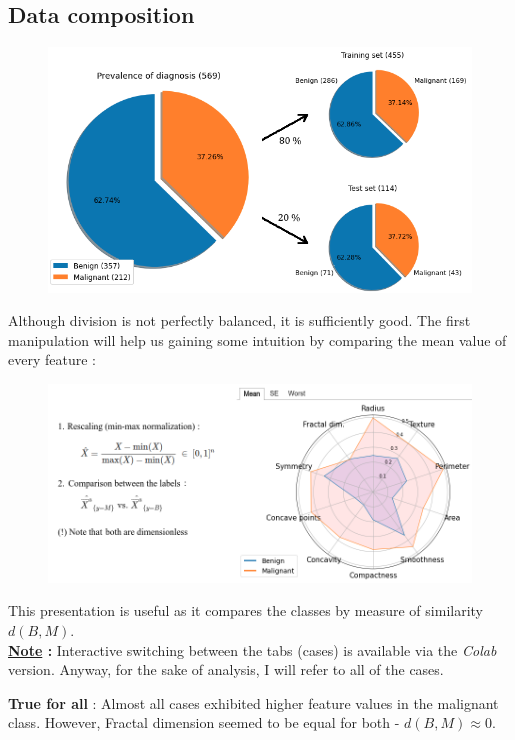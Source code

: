 \documentclass[12pt]{article}
\numberwithin{equation}{section}
\begin{document}
\begin{flushleft}
\subsection{Data composition}
\begin{figure}[H]
\centering
\includegraphics[width=0.82\linewidth, center]{train_split.png}
\end{figure}
Although division is not perfectly balanced, it is sufficiently good. The first manipulation will help us gaining some intuition by comparing the mean value of every feature :
\begin{figure}[H]
\centering
\includegraphics[width=1.045\linewidth, center]{comparison.png}
\end{figure}
This presentation is useful as it compares the classes by measure of similarity  $d(B,M)$. \\
\textbf{\underline{Note} :} Interactive switching between the tabs (cases) is available via the \textit{Colab}\\ \hspace{13.5mm} version. Anyway, for the sake of analysis, I will refer to all of the cases.

\textbf{True for all} : Almost all cases exhibited higher feature values in the malignant class. However, Fractal dimension seemed to be equal for both - $d(B,M) \approx 0$.



\end{flushleft}
\end{document}
